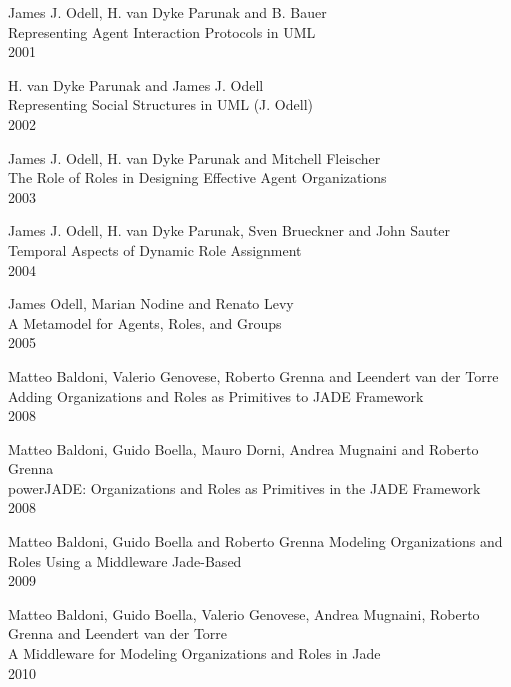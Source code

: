 \begin{thebibliography}{99}
James J. Odell, H. van Dyke Parunak and B. Bauer\\
Representing Agent Interaction Protocols in UML\\
2001

H. van Dyke Parunak and James J. Odell\\
Representing Social Structures in UML (J. Odell)\\
2002

James J. Odell, H. van Dyke Parunak and Mitchell Fleischer\\
The Role of Roles in Designing Effective Agent Organizations\\
2003

James J. Odell, H. van Dyke Parunak, Sven Brueckner and John Sauter\\
Temporal Aspects of Dynamic Role Assignment\\
2004

James Odell, Marian Nodine and Renato Levy\\
A Metamodel for Agents, Roles, and Groups\\
2005


Matteo Baldoni, Valerio Genovese, Roberto Grenna and Leendert van der Torre\\
Adding Organizations and Roles as Primitives to JADE Framework\\
2008

Matteo Baldoni, Guido Boella, Mauro Dorni, Andrea Mugnaini and Roberto Grenna\\
powerJADE: Organizations and Roles as Primitives in the JADE Framework\\
2008

Matteo Baldoni, Guido Boella and Roberto Grenna
Modeling Organizations and Roles Using a Middleware Jade-Based\\
2009

Matteo Baldoni, Guido Boella, Valerio Genovese, Andrea Mugnaini, Roberto Grenna and Leendert van der Torre\\
A Middleware for Modeling Organizations and Roles in Jade\\
2010



\end{thebibliography}
